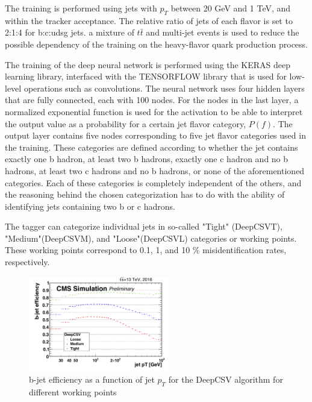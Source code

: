 The training is performed using jets with $p_{T}$ between 20 GeV and 1 TeV, and within the tracker acceptance. The relative ratio of jets of each flavor is set to 2:1:4 for b:c:udsg jets. a mixture of $t\bar{t}$ and multi-jet events is used to reduce the possible dependency of the training on the heavy-flavor quark production process.

The training of the deep neural network is performed using the KERAS\cite{chollet2015keras} deep learning library, interfaced with the TENSORFLOW\cite{tensorflow2015-whitepaper} library that is used for low-level operations such as convolutions. The neural network uses four hidden layers that are fully connected, each with 100 nodes. For the nodes in the last layer, a normalized exponential function is used for the activation to be able to interpret the output value as a probability for a certain jet flavor category, $P(f)$. The output layer contains five nodes corresponding to five jet flavor categories used in the training. These categories are defined according to whether the jet contains exactly one b hadron, at least two b hadrons, exactly one c hadron and no b hadrons, at least two c hadrons and no b hadrons, or none of the aforementioned categories. Each of these categories is completely independent of the others, and the reasoning behind the chosen categorization has to do with the ability of identifying jets containing two b or c hadrons. 

The tagger can categorize individual jets in so-called "Tight" (DeepCSVT), "Medium"(DeepCSVM), and "Loose"(DeepCSVL) categories or working points. These working points correspond to 0.1, 1, and 10 $\%$ misidentification rates, respectively.

\begin{figure}[h]
 	\centering
 	\includegraphics[width=0.55\textwidth]{figures/effvspt_b_deep.png}
 	\singlespace
 	\caption{b-jet efficiency as a function of jet $p_{T}$ for the DeepCSV algorithm for different working points\cite{Sirunyan_2018}}
 	  	\label{fig:deepcsv}
 \end{figure}

